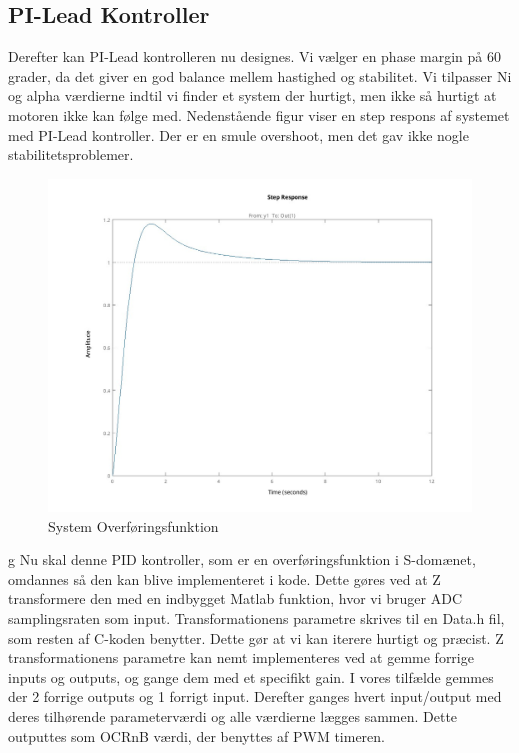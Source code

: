 \documentclass[../main.tex]{subfiles}
\begin{document}
\subsection{PI-Lead Kontroller}
Derefter kan PI-Lead kontrolleren nu designes. Vi vælger en phase margin på 60 grader, da det giver en god balance mellem hastighed og stabilitet. Vi tilpasser Ni og alpha værdierne indtil vi finder et system der hurtigt, men ikke så hurtigt at motoren ikke kan følge med. Nedenstående figur viser en step respons af systemet med PI-Lead kontroller. Der er en smule overshoot, men det gav ikke nogle stabilitetsproblemer.
\begin{figure}[h]
      \includegraphics[width=\textwidth]{Dokumentation/Figures/Motor PID Step Response.jpg}
     \caption{System Overføringsfunktion}
     \label{fig: System Overføringsfunktion}
\end{figure}
g
Nu skal denne PID kontroller, som er en overføringsfunktion i S-domænet, omdannes så den kan blive implementeret i kode. Dette gøres ved at Z transformere den med en indbygget Matlab funktion, hvor vi bruger ADC samplingsraten som input. Transformationens parametre skrives til en Data.h fil, som resten af C-koden benytter. Dette gør at vi kan iterere hurtigt og præcist. Z transformationens parametre kan nemt implementeres ved at gemme forrige inputs og outputs, og gange dem med et specifikt gain. I vores tilfælde gemmes der 2 forrige outputs og 1 forrigt input. Derefter ganges hvert input/output med deres tilhørende parameterværdi og alle værdierne lægges sammen. Dette outputtes som OCRnB værdi, der benyttes af PWM timeren.
\end{document}
